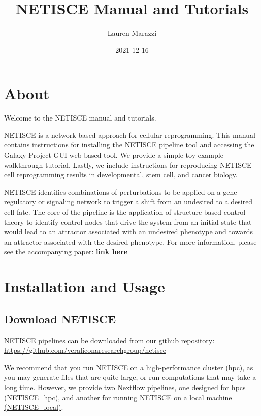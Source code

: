 \documentclass[
]{book}
\title{NETISCE Manual and Tutorials}
\author{Lauren Marazzi}
\date{2021-12-16}
\begin{document}
\maketitle

{
\setcounter{tocdepth}{1}
\tableofcontents
}
\hypertarget{about}{%
\chapter{About}\label{about}}

Welcome to the NETISCE manual and tutorials.

NETISCE is a network-based approach for cellular reprogramming. This manual contains instructions for installing the NETISCE pipeline tool and accessing the Galaxy Project GUI web-based tool. We provide a simple toy example walkthrough tutorial. Lastly, we include instructions for reproducing NETISCE cell reprogramming results in developmental, stem cell, and cancer biology.

NETISCE identifies combinations of perturbations to be applied on a gene regulatory or signaling network to trigger a shift from an undesired to a desired cell fate. The core of the pipeline is the application of structure-based control theory to identify control nodes that drive the system from an initial state that would lead to an attractor associated with an undesired phenotype and towards an attractor associated with the desired phenotype. For more information, please see the accompanying paper: \textbf{link here}

\hypertarget{installation-and-usage}{%
\chapter{Installation and Usage}\label{installation-and-usage}}

\hypertarget{download-netisce}{%
\section{Download NETISCE}\label{download-netisce}}

NETISCE pipelines can be downloaded from our github repository: \url{https://github.com/veraliconaresearchgroup/netisce}

We recommend that you run NETISCE on a high-performance cluster (hpc), as you may generate files that are quite large, or run computations that may take a long time. However, we provide two Nextflow pipelines, one designed for hpcs \href{https://github.com/VeraLiconaResearchGroup/Netisce/tree/main/NETICSE_hpc}{(NETISCE\_hpc)}, and another for running NETISCE on a local machine \href{https://github.com/VeraLiconaResearchGroup/Netisce/tree/main/NETICSE_local}{(NETISCE\_local)}.
\end{document}
